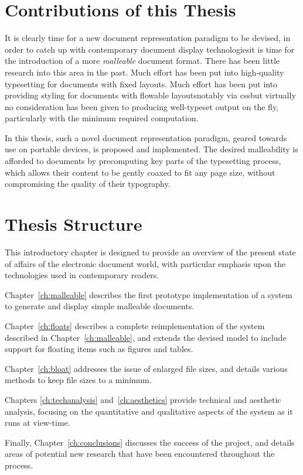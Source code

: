 \section{Contributions of this Thesis}

It is clearly time for a new document representation paradigm to be devised, in order to catch up with contemporary document display technologies\ed it is time for the introduction of a more \emph{malleable} document format. There has been little research into this area in the past. Much effort has been put into high-quality typesetting for documents with fixed layouts. Much effort has been put into providing styling for documents with flowable layouts\ed notably via css\ed but virtually no consideration has been given to producing well-typeset output on the fly, particularly with the minimum required computation.

In this thesis, such a novel document representation paradigm, geared towards use on portable devices, is proposed and implemented. The desired malleability is afforded to documents by precomputing key parts of the typesetting process, which allows their content to be gently coaxed to fit any page size, without compromising the quality of their typography.



\section{Thesis Structure}

This introductory chapter is designed to provide an overview of the present state of affairs of the electronic document world, with particular emphasis upon the technologies used in contemporary \ebook{} readers. 

Chapter~\ref{ch:malleable} describes the first prototype implementation of a system to generate and display simple malleable documents.

Chapter~\ref{ch:floats} describes a complete reimplementation of the system described in Chapter~\ref{ch:malleable}, and extends the devised model to include support for floating items such as figures and tables.

Chapter~\ref{ch:bloat} addresses the issue of enlarged file sizes, and details various methods to keep file sizes to a minimum.

Chapters \ref{ch:techanalysis} and~\ref{ch:aesthetics} provide technical and aesthetic analysis, focusing on the quantitative and qualitative aspects of the system as it runs at view-time.

Finally, Chapter~\ref{ch:conclusions} discusses the success of the project, and details areas of potential new research that have been encountered throughout the process.
